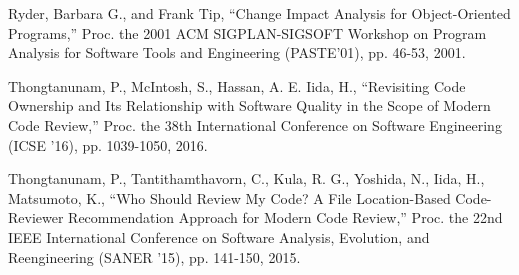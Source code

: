\documentclass{fose2016}           %
\begin{document}
\begin{thebibliography}{10}
Ryder, Barbara G., and Frank Tip, ``Change Impact Analysis for Object-Oriented Programs,'' Proc. the 2001 ACM SIGPLAN-SIGSOFT Workshop on Program Analysis for Software Tools and Engineering (PASTE'01), pp. 46-53, 2001.

Thongtanunam, P., McIntosh, S., Hassan, A. E. Iida, H., ``Revisiting Code Ownership and Its Relationship with Software Quality in the Scope of Modern Code Review,'' Proc. the 38th International Conference on Software Engineering (ICSE '16), pp. 1039-1050, 2016.

Thongtanunam, P., Tantithamthavorn, C., Kula, R. G., Yoshida, N., Iida, H., Matsumoto, K., ``Who Should Review My Code? A File Location-Based Code-Reviewer Recommendation Approach for Modern Code Review,'' Proc. the 22nd IEEE International Conference on Software Analysis, Evolution, and Reengineering (SANER '15), pp. 141-150, 2015.


\end{thebibliography}
\end{document}
